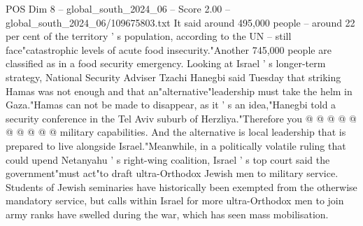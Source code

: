 \begin{textsample}{POS Dim 8 – global\_south\_2024\_06 – Score 2.00 – global\_south\_2024\_06/109675803.txt}
It said around 495,000 people -- around 22 per cent of the territory ' s population, according to the UN -- still face"catastrophic levels of acute food insecurity."Another 745,000 people are classified as in a food security emergency.
Looking at Israel ' s longer-term strategy, National Security Adviser Tzachi Hanegbi said Tuesday that striking Hamas was not enough and that an"alternative"leadership must take the helm in Gaza."Hamas can not be made to disappear, as it ' s an idea,"Hanegbi told a security conference in the Tel Aviv suburb of Herzliya."Therefore you @ @ @ @ @ @ @ @ @ @ military capabilities.
And the alternative is local leadership that is prepared to live alongside Israel."Meanwhile, in a politically volatile ruling that could upend Netanyahu ' s right-wing coalition, Israel ' s top court said the government"must act"to draft ultra-Orthodox Jewish men to military service.
Students of Jewish seminaries have historically been exempted from the otherwise mandatory service, but calls within Israel for more ultra-Orthodox men to join army ranks have swelled during the war, which has seen mass mobilisation.

\end{textsample}
